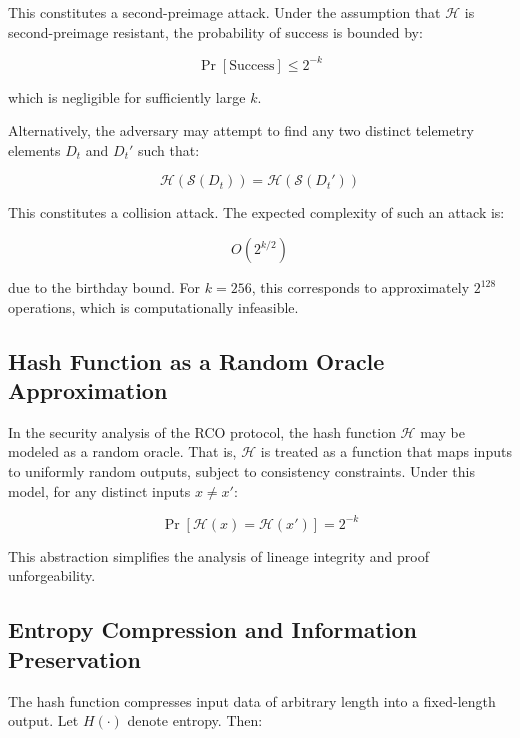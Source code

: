 This constitutes a second-preimage attack. Under the assumption that $\mathcal{H}$ is second-preimage resistant, the probability of success is bounded by:

\begin{equation}
\Pr[\text{Success}] \leq 2^{-k}
\end{equation}

which is negligible for sufficiently large $k$.

Alternatively, the adversary may attempt to find any two distinct telemetry elements $D_t$ and $D_t'$ such that:

\begin{equation}
\mathcal{H}(\mathcal{S}(D_t)) = \mathcal{H}(\mathcal{S}(D_t'))
\end{equation}

This constitutes a collision attack. The expected complexity of such an attack is:

\begin{equation}
O(2^{k/2})
\end{equation}

due to the birthday bound. For $k = 256$, this corresponds to approximately $2^{128}$ operations, which is computationally infeasible.

\subsection{Hash Function as a Random Oracle Approximation}

In the security analysis of the RCO protocol, the hash function $\mathcal{H}$ may be modeled as a random oracle. That is, $\mathcal{H}$ is treated as a function that maps inputs to uniformly random outputs, subject to consistency constraints. Under this model, for any distinct inputs $x \neq x'$:

\begin{equation}
\Pr[\mathcal{H}(x) = \mathcal{H}(x')] = 2^{-k}
\end{equation}

This abstraction simplifies the analysis of lineage integrity and proof unforgeability.

\subsection{Entropy Compression and Information Preservation}

The hash function compresses input data of arbitrary length into a fixed-length output. Let $H(\cdot)$ denote entropy. Then:

